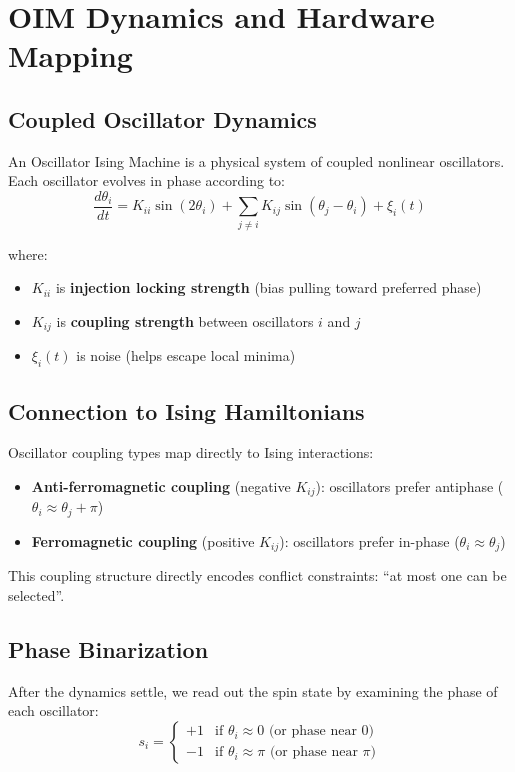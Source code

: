 \section{OIM Dynamics and Hardware Mapping}
\label{sec:oim-dynamics}

\subsection{Coupled Oscillator Dynamics}

An Oscillator Ising Machine is a physical system of coupled nonlinear oscillators. Each oscillator evolves in phase according to:
\[
\frac{d\theta_i}{dt} = K_{ii} \sin(2\theta_i) + \sum_{j \neq i} K_{ij} \sin(\theta_j - \theta_i) + \xi_i(t)
\]

where:
\begin{itemize}
\item $K_{ii}$ is \textbf{injection locking strength} (bias pulling toward preferred phase)
\item $K_{ij}$ is \textbf{coupling strength} between oscillators $i$ and $j$
\item $\xi_i(t)$ is noise (helps escape local minima)
\end{itemize}

\subsection{Connection to Ising Hamiltonians}

Oscillator coupling types map directly to Ising interactions:
\begin{itemize}
\item \textbf{Anti-ferromagnetic coupling} (negative $K_{ij}$): oscillators prefer antiphase ($\theta_i \approx \theta_j + \pi$)
\item \textbf{Ferromagnetic coupling} (positive $K_{ij}$): oscillators prefer in-phase ($\theta_i \approx \theta_j$)
\end{itemize}

This coupling structure directly encodes conflict constraints: ``at most one can be selected''.

\subsection{Phase Binarization}

After the dynamics settle, we read out the spin state by examining the phase of each oscillator:
\[
s_i = \begin{cases} +1 & \text{if } \theta_i \approx 0 \text{ (or phase near 0)} \\ -1 & \text{if } \theta_i \approx \pi \text{ (or phase near } \pi) \end{cases}
\]

